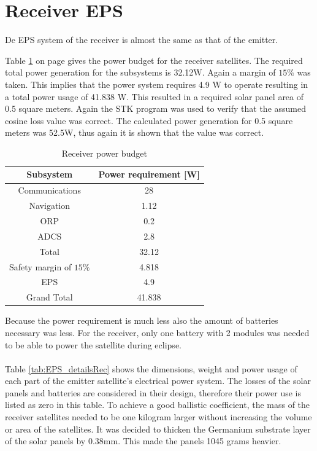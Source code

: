 \section{Receiver EPS}
\label{receiver_EPS}

De EPS system of the receiver is almost the same as that of the emitter.

Table \ref{tab:receiverPowerBudget} on page \pageref{tab:receiverPowerBudget}gives the power budget for the receiver satellites. The required total power generation for the subsystems is 32.12W. Again a margin of $15\%$ was taken. This implies that the power system requires 4.9 W to operate resulting in a total power usage of 41.838 W. This resulted in a required solar panel area of 0.5 square meters. Again the STK program was used to verify that the assumed cosine loss value was correct. The calculated power generation for 0.5 square meters was 52.5W, thus again it is shown that the value was correct.

\begin{table}
\centering
\begin{tabular}{cc}
\toprule
Subsystem & Power requirement [W]\\
\midrule
Communications & 28\\
Navigation & 1.12\\
ORP & 0.2\\
ADCS & 2.8\\
\midrule
Total & 32.12\\
Safety margin of $15\%$ & 4.818\\
EPS & 4.9\\
\midrule
\midrule
Grand Total & 41.838\\
\bottomrule
\end{tabular}
\caption{Receiver power budget}
\label{tab:receiverPowerBudget}
\end{table}

Because the power requirement is much less also the amount of batteries necessary was less. For the receiver, only one battery with 2 modules was needed to be able to power the satellite during eclipse.
\\\\
Table \ref{tab:EPS_detailsRec} shows the dimensions, weight and power usage of each part of the emitter satellite's electrical power system. The losses of the solar panels and batteries are considered in their design, therefore their power use is listed as zero in this table. To achieve a good ballistic coefficient, the mass of the receiver satellites needed to be one kilogram larger without increasing the volume or area of the satellites. It was decided to thicken the Germanium substrate layer of the solar panels by 0.38mm. This made the panels 1045 grams heavier.

